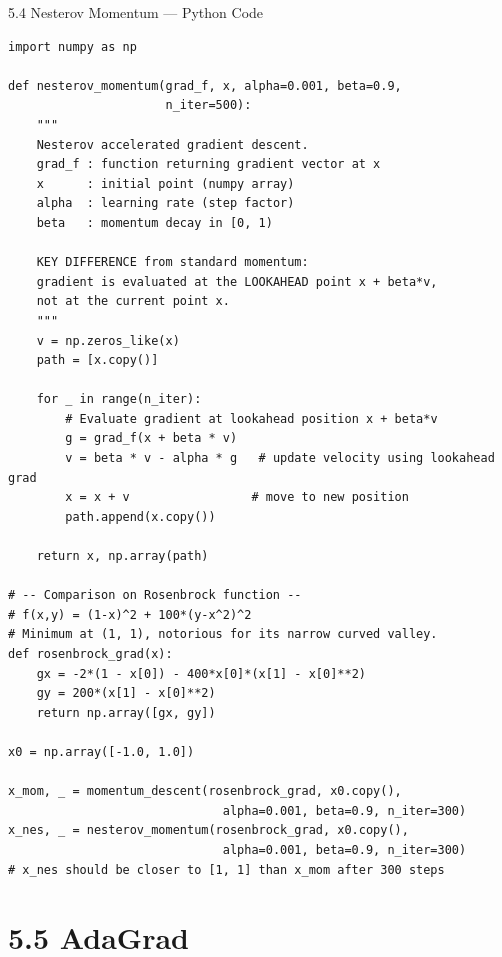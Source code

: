 \documentclass[aspectratio=169,10pt]{beamer}
\begin{document}
\begin{frame}[fragile]{5.4 Nesterov Momentum --- Python Code}
\begin{lstlisting}[caption={Nesterov Accelerated Gradient Descent (Python/NumPy)}]
import numpy as np

def nesterov_momentum(grad_f, x, alpha=0.001, beta=0.9,
                      n_iter=500):
    """
    Nesterov accelerated gradient descent.
    grad_f : function returning gradient vector at x
    x      : initial point (numpy array)
    alpha  : learning rate (step factor)
    beta   : momentum decay in [0, 1)

    KEY DIFFERENCE from standard momentum:
    gradient is evaluated at the LOOKAHEAD point x + beta*v,
    not at the current point x.
    """
    v = np.zeros_like(x)
    path = [x.copy()]

    for _ in range(n_iter):
        # Evaluate gradient at lookahead position x + beta*v
        g = grad_f(x + beta * v)
        v = beta * v - alpha * g   # update velocity using lookahead grad
        x = x + v                 # move to new position
        path.append(x.copy())

    return x, np.array(path)

# -- Comparison on Rosenbrock function --
# f(x,y) = (1-x)^2 + 100*(y-x^2)^2
# Minimum at (1, 1), notorious for its narrow curved valley.
def rosenbrock_grad(x):
    gx = -2*(1 - x[0]) - 400*x[0]*(x[1] - x[0]**2)
    gy = 200*(x[1] - x[0]**2)
    return np.array([gx, gy])

x0 = np.array([-1.0, 1.0])

x_mom, _ = momentum_descent(rosenbrock_grad, x0.copy(),
                              alpha=0.001, beta=0.9, n_iter=300)
x_nes, _ = nesterov_momentum(rosenbrock_grad, x0.copy(),
                              alpha=0.001, beta=0.9, n_iter=300)
# x_nes should be closer to [1, 1] than x_mom after 300 steps
\end{lstlisting}
\end{frame}

\section{5.5 AdaGrad}
\end{document}
